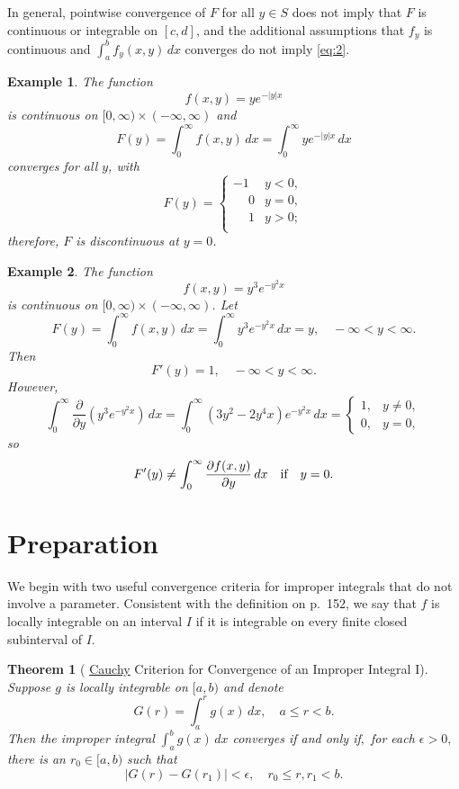 \documentclass{article}
\newtheorem{theorem}{Theorem}
\newtheorem{example}{Example}
\newcommand{\pd}[2]{\frac{\partial{#1}}{\partial{#2}}}
\begin{document}
In general, pointwise convergence of $F$ for all $y\in S$ does not imply
that $F$ is continuous or integrable on $[c,d]$, and the additional
assumptions that $f_{y}$ is continuous and $\int_{a}^{b}f_{y}(x,y)\,dx$
converges do not  imply \eqref{eq:2}.


\begin{example}  \label{example:2}  \rm
The function
$$
f(x,y)=ye^{-|y|x}
$$
is continuous on $[0,\infty)\times (-\infty,\infty)$ and
$$
F(y)=\int_{0}^{\infty}f(x,y)\,dx =\int_{0}^{\infty}ye^{-|y|x}\,dx
$$
converges for all $y$, with
$$
F(y)=
\begin{cases}
-1& y<0,\\
\phantom{-}0&y=0,\\
\phantom{-}1&y>0;\\
\end{cases}
$$
therefore, $F$ is discontinuous at $y=0$.
\end{example}

\begin{example}  \label{example:3}  \rm
The function
$$
f(x,y)=y^{3}e^{-y^{2}x}
$$
is continuous on $[0,\infty)\times (-\infty,\infty)$.
Let
$$
F(y)=\int_{0}^{\infty}f(x,y)\,dx=
\int_{0}^{\infty}y^{3}e^{-y^{2}x}\,dx  =y,\quad -\infty<y<\infty.
$$
 Then
$$
F'(y)=1, \quad -\infty<y<\infty.
$$
However,
$$
\int_{0}^{\infty}\pd{}{y}(y^{3}e^{-y^{2}x})\,dx
=\int_{0}^{\infty}(3y^{2}-2y^{4}x)e^{-y^{2}x}\,dx=
\begin{cases}
1,& y\ne0,\\
0,& y=0,
\end{cases}
$$
so
$$
F'(y)\ne\int_{0}^{\infty}\pd{f(x,y)}{y}\,dx\text{\quad if\quad}y=0.
$$
\end{example}

\section{Preparation} \label{section:preparation}


 We begin with two useful convergence criteria for improper integrals
that do not involve a parameter.
Consistent with the definition on p.~152, we say that $f$ is locally
integrable on
an interval $I$ if it is integrable on every finite closed subinterval of
$I$.

\begin{theorem}[
\href{http://www-history.mcs.st-and.ac.uk/Biographies/Cauchy.html}
{Cauchy}
Criterion for Convergence of an Improper
Integral I]
\label{theorem:2}
Suppose  $g$ is
locally integrable on  $[a,b)$ and denote
$$
G(r)=\int_{a}^{r}g(x)\,dx,\quad  a\le r<b.
$$
Then the improper integral $\int_{a}^{b}g(x)\,dx$ converges if and only
if$,$ for each
$\epsilon >0,$ there is an $r_{0}\in[a,b)$  such that
\begin{equation} \label{eq:9}
|G(r)-G(r_{1})|<\epsilon,\quad  r_{0}\le r,r_{1}<b.
\end{equation}
\end{theorem}
\end{document}
